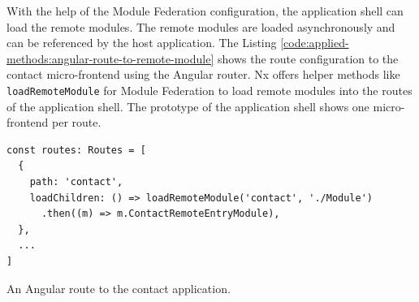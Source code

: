 \noindent With the help of the Module Federation configuration, the application shell can load the remote modules. The remote modules are loaded asynchronously and can be referenced by the host application. The Listing \ref{code:applied-methods:angular-route-to-remote-module} shows the route configuration to the contact micro-frontend using the Angular router. Nx offers helper methods like \texttt{loadRemoteModule} for Module Federation to load remote modules into the routes of the application shell. The prototype of the application shell shows one micro-frontend per route.

\ifshowListings
\begin{listing}[H]
  \begin{verbatim}
const routes: Routes = [
  {
    path: 'contact',
    loadChildren: () => loadRemoteModule('contact', './Module')
      .then((m) => m.ContactRemoteEntryModule),
  },
  ...
]
  \end{verbatim}
  \caption{An Angular route to the contact application.}\label{code:applied-methods:angular-route-to-remote-module}
\end{listing}
\fi

\ifshowAppliedMethodsCustomNginxConfSection
  
\fi





\ifshowAppliedMethodsLoadRemoteSettingsSection
  
\fi

\ifshowAppliedMethodsSecondaryEntrypoints
  
\fi